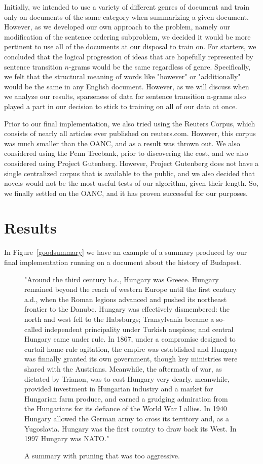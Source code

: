 \documentclass[12pt]{article}
\theoremstyle{plain}
\theoremstyle{definition}
\theoremstyle{remark}
\theoremstyle{plain}
\begin{document}
Initially, we intended to use a variety of different genres of document and train only on documents of the same category when summarizing a given document. However, as we developed our own approach to the problem, namely our modification of the sentence ordering subproblem, we decided it would be more pertinent to use all of the documents at our disposal to train on. For starters, we concluded that the logical progression of ideas that are hopefully represented by sentence transition $n$-grams would be the same regardless of genre. Specifically, we felt that the structural meaning of words like "however" or "additionally" would be the same in any English document. However, as we will discuss when we analyze our results, sparseness of data for sentence transition n-grams also played a part in our decision to stick to training on all of our data at once. 

	Prior to our final implementation, we also tried using the Reuters Corpus, which consists of nearly all articles ever published on reuters.com. However, this corpus was much smaller than the OANC, and as a result was thrown out. We also considered using the Penn Treebank, prior to discovering the cost, and we also considered using Project Gutenberg. However, Project Gutenberg does not have a single centralized corpus that is available to the public, and we also decided that novels would not be the most useful tests of our algorithm, given their length. So, we finally settled on the OANC, and it has proven successful for our purposes.
\section{Results}

	In Figure~\ref{goodsummary} we have an example of a summary produced by our final implementation running on a document about the history of Budapest.

	
	
\begin{figure}
"Around the third century b.c., Hungary was Greece. Hungary remained beyond the reach of western Europe until the first century a.d., when the Roman legions advanced and pushed its northeast frontier to the Danube. Hungary was effectively dismembered: the north and west fell to the Habsburgs; Transylvania became a so-called independent principality under Turkish auspices; and central Hungary came under rule. In 1867, under a compromise designed to curtail home-rule agitation, the empire was established and Hungary was finnally granted its own government, though key ministries were shared with the Austrians. Meanwhile, the aftermath of war, as dictated by Trianon, was to cost Hungary very dearly. meanwhile, provided investment in Hungarian industry and a market for Hungarian farm produce, and earned a grudging admiration from the Hungarians for its defiance of the World War I allies. In 1940 Hungary allowed the German army to cross its territory and, as a Yugoslavia. Hungary was the first country to draw back its West. In 1997 Hungary was NATO."
\caption{A summary with pruning that was too aggressive.}\label{badsummary}
\end{figure}
\end{document}
